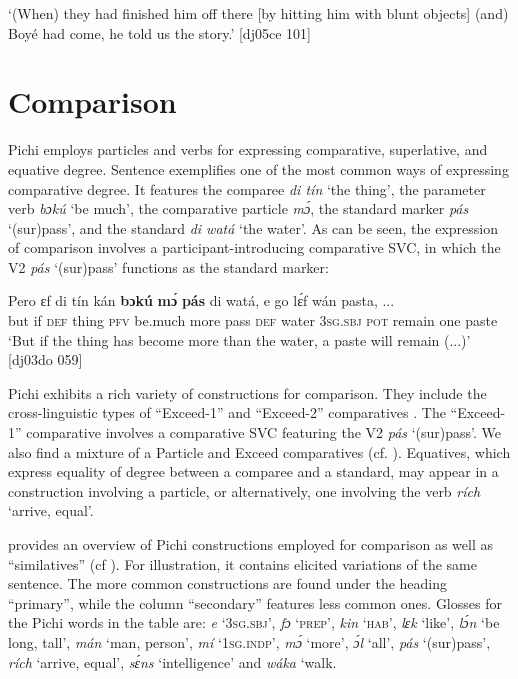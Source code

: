 \glt ‘(When) they had finished him off there [by hitting him with blunt objects] 
(and) Boyé had come, he told us the story.’ [dj05ce 101]
\z

\section{Comparison}\label{sec:6.9}

Pichi employs particles and verbs for expressing comparative, superlative, and equative degree. Sentence  exemplifies one of the most common ways of expressing comparative degree. It features the comparee \textit{di tín} ‘the thing’, the parameter verb \textit{bɔkú} ‘be much’, the comparative particle \textit{mɔ́}, the standard marker \textit{pás} ‘(sur)pass’, and the standard \textit{di watá} ‘the water’. As can be seen, the expression of comparison involves a participant-introducing\index{} comparative SVC, in which the V2 \textit{pás} ‘(sur)pass’ functions as the standard marker: 


\ea%
    \label{ex:key:466}
    \gll Pero    ɛf  di  tín    kán    \textbf{bɔkú}  \textbf{mɔ́}    \textbf{pás}\textbf{} di  watá,
e    go  lɛ́f    wán  pasta,  \op...\cp{}\\
but    if  \textsc{def}  thing  \textsc{pfv}    be.much  more  pass    \textsc{def}  water
\textsc{3sg.sbj}  \textsc{pot}  remain  one  paste\\

\glt ‘But if the thing has become more than the water, a paste
will remain (...)’ [dj03do 059]
\z

Pichi exhibits a rich variety of constructions for comparison. They include the cross-linguistic types of “Exceed-1” and “Exceed-2” comparatives \citep{Stassen1985}. The “Exceed-1” comparative involves a comparative SVC featuring the V2 \textit{pás} ‘(sur)pass’. We also find a mixture of a Particle and Exceed comparatives (cf. ). Equatives, which express equality of degree between a comparee and a standard, may appear in a construction involving a particle, or alternatively, one involving the verb \textit{rích} ‘arrive, equal’.

 provides an overview of Pichi constructions employed for comparison as well as “similatives” (cf ). For illustration, it contains elicited variations of the same sentence. The more common constructions are found under the heading “primary”, while the column “secondary” features less common ones. Glosses for the Pichi words in the table are: \textit{e} ‘\textsc{3sg.sbj}’, \textit{fɔ} ‘\textsc{prep}’, \textit{kin} ‘\textsc{hab}’, \textit{lɛk} ‘like’, \textit{lɔ́n} ‘be long, tall’, \textit{mán} ‘man, person’, \textit{mí} ‘\textsc{1sg.indp}’, \textit{mɔ́} ‘more’, \textit{ɔ́l} ‘all’, \textit{pás} ‘(sur)pass’, \textit{rích} ‘arrive, equal’, \textit{sɛ́ns} ‘intelligence’ and \textit{wáka} ‘walk.

